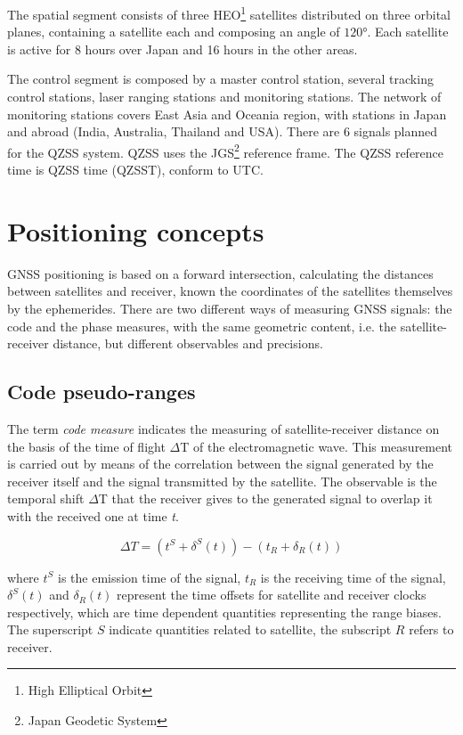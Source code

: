 The spatial segment consists of three HEO\footnote{High Elliptical Orbit} satellites distributed on three orbital planes, containing a satellite each and composing an angle of $\ang{120}$. Each satellite is active for 8 hours over Japan and 16 hours in the other areas.

The control segment is composed by a master control station, several tracking control stations, laser ranging stations and monitoring stations. The network of monitoring stations covers East Asia and Oceania region, with stations in Japan and abroad (India, Australia, Thailand and USA). There are 6 signals planned for the QZSS system.
QZSS uses the JGS\footnote{Japan Geodetic System} reference frame. The QZSS reference time is QZSS time (QZSST), conform to UTC.

\section{Positioning concepts}

GNSS positioning is based on a forward intersection, calculating the distances between satellites and receiver, known the coordinates of the satellites themselves by the ephemerides. There are two different ways of measuring GNSS signals: the code and the phase measures, with the same geometric content, i.e. the satellite-receiver distance, but different observables and precisions.

\subsection{Code pseudo-ranges}

The term \textit{code measure} indicates the measuring of satellite-receiver distance on the basis of the time of
flight $\Delta$T of the electromagnetic wave. This measurement is carried out by means of the correlation
between the signal generated by the receiver itself and the signal transmitted by the satellite.
The observable is the temporal shift $\Delta$T that the receiver gives to the generated signal to overlap it with
the received one at time \textit{t}.

\begin{equation}
	\Delta T = \left(t^{S}+\delta^{S}(t)\right)-\left(t_{R}+\delta_{R}(t)\right)
	\label{eq:DTcode_measure}
\end{equation}

where $t^{S}$ is the emission time of the signal, $t_{R}$ is the receiving time of the signal, $\delta^{S}(t)$ and $\delta_{R}(t)$ represent the time offsets for satellite and receiver clocks respectively, which are time dependent quantities representing the range biases. The superscript $S$ indicate quantities related to satellite, the subscript $R$ refers to receiver.

